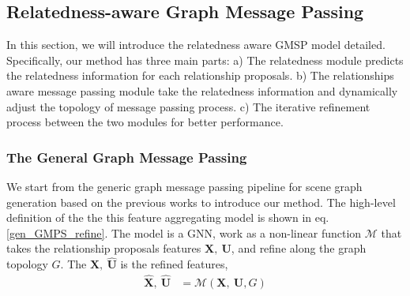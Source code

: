 


\subsection{Relatedness-aware Graph Message Passing}
In this section, we will introduce the relatedness aware GMSP model detailed.
Specifically, our method has three main parts: 
a) The relatedness module predicts the relatedness information for each relationship proposals. b) The relationships aware message passing module take the relatedness information and dynamically adjust the topology of message passing process. c) The iterative refinement process between the two modules for better performance.

\subsubsection{The General Graph Message Passing}
We start from the generic graph message passing pipeline for scene graph generation based on the previous works to introduce our method. 
The high-level definition of the the this feature aggregating model is shown in eq. \ref{gen_GMPS_refine}. The model is a GNN, work as a non-linear function $\mathcal{M}$ that takes the relationship proposals features $\mathbf{X},~ \mathbf{U}$, and refine along the graph topology $G$.
The $\mathbf{\hat{X}},~ \mathbf{\hat{U}}$ is the refined features,
\begin{align}
    \mathbf{\hat{X}},~ \mathbf{\hat{U}}  &= \mathcal{M}(\mathbf{X},~ \mathbf{U}, G) 
    \label{gen_GMPS_refine} 
\end{align}

